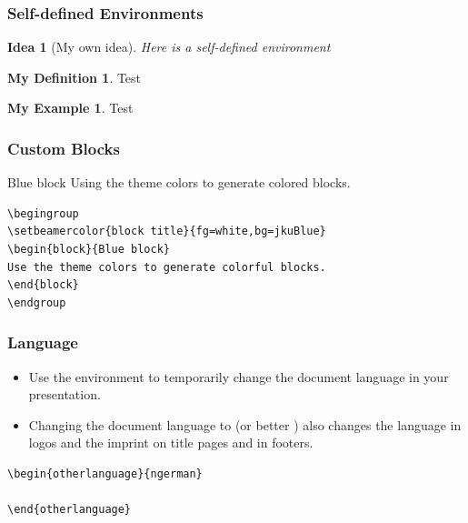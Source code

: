 \documentclass[utf8,aspectratio=169,ngerman,english]{beamer}
\begin{document}
\newtheorem{idea}[theorem]{Idea}
\theoremstyle{definition}
\newtheorem{defi}[theorem]{My Definition}
\theoremstyle{example}
\newtheorem{ex}[theorem]{My Example}

\begin{frame}[fragile]
\frametitle{Self-defined Environments}

\begin{idea}[My own idea]
Here is a self-defined environment
\end{idea}

\begin{defi}
Test
\end{defi}

\begin{ex}
Test
\end{ex}
\end{frame}


\begin{frame}[fragile]
\frametitle{Custom Blocks}
\begingroup
{}
\begin{block}{Blue block}
Using the theme colors to generate colored blocks.
\end{block}
\endgroup

\begin{lstlisting}[language={[LaTeX]TeX},numbers=none]
\begingroup
\setbeamercolor{block title}{fg=white,bg=jkuBlue}
\begin{block}{Blue block}
Use the theme colors to generate colorful blocks.
\end{block}
\endgroup
\end{lstlisting}
\end{frame}


\begin{otherlanguage}{ngerman}
\begin{frame}[fragile]
\frametitle{Language}
\begin{itemize}
\item Use the  environment to temporarily change the document language in your presentation.
\item Changing the document language to  (or better ) also changes the language in logos and the imprint on title pages and in footers.
\end{itemize}

\begin{lstlisting}[language={[LaTeX]TeX},numbers=none]
\begin{otherlanguage}{ngerman}

\end{otherlanguage}
\end{lstlisting}
\end{frame}
\end{otherlanguage}
\end{document}
